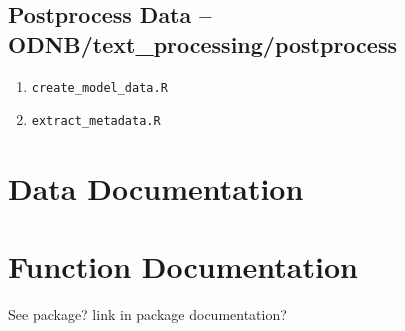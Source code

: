 \documentclass[11pt]{article}
\newcommand{\filename}[1]{ \texttt{#1}}
\begin{document}
\subsection{Postprocess Data -- ODNB/text\_processing/postprocess}
\begin{enumerate}
\item \filename{create\_model\_data.R}
\begin{enumerate}

\end{enumerate}


\item \filename{extract\_metadata.R}
\begin{enumerate}

\end{enumerate}


\end{enumerate}




\section{Data Documentation}



\section{Function Documentation}
See package? link in package documentation?
\end{document}
